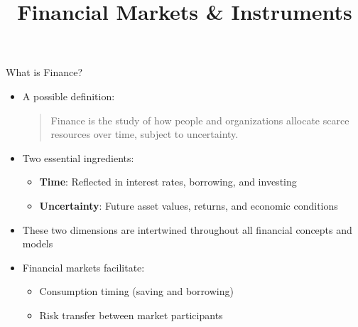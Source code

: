 \documentclass[10pt]{beamer}
\title{Financial Markets \& Instruments}
\author{}
\date{}
\begin{document}
\begin{frame}
\titlepage
\end{frame}

\begin{frame}{What is Finance?}
  \begin{itemize}[<+->]
    \item A possible definition:
    \begin{quote}
      Finance is the study of how people and organizations allocate scarce resources over time, subject to uncertainty.
    \end{quote}
    \item Two essential ingredients:
      \begin{itemize}
        \item \textbf{Time}: Reflected in interest rates, borrowing, and investing
        \item \textbf{Uncertainty}: Future asset values, returns, and economic conditions
      \end{itemize}
    \item These two dimensions are intertwined throughout all financial concepts and models
    \item Financial markets facilitate:
      \begin{itemize}
        \item Consumption timing (saving and borrowing)
        \item Risk transfer between market participants
      \end{itemize}
  \end{itemize}
\end{frame}
\end{document}
